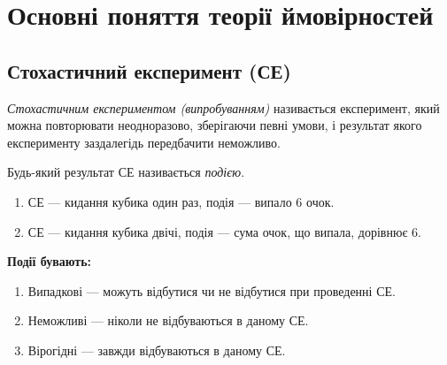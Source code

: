 
\section{Основні поняття теорії ймовірностей}
\subsection{Стохастичний експеримент (СЕ)}
\begin{definition}
    \emph{Стохастичним експериментом (випробуванням)} називається експеримент, 
    який можна повторювати неодноразово, зберігаючи певні умови, і результат якого 
    експерименту заздалегідь передбачити неможливо.
\end{definition}
\begin{definition}
    Будь-який результат СЕ називається \emph{подією}.
\end{definition}
\begin{example}
    \begin{enumerate}
        \mbox{}
        \item СЕ --- кидання кубика один раз, подія --- випало 6 очок.
        \item СЕ --- кидання кубика двічі, подія --- сума очок, що випала, дорівнює 6.
    \end{enumerate}
\end{example}

\noindent \textbf{Події бувають:}
\begin{enumerate}
    \item Випадкові --- можуть відбутися чи не відбутися при проведенні СЕ.
    \item Неможливі --- ніколи не відбуваються в даному СЕ.
    \item Вірогідні --- завжди відбуваються в даному СЕ.
\end{enumerate}

